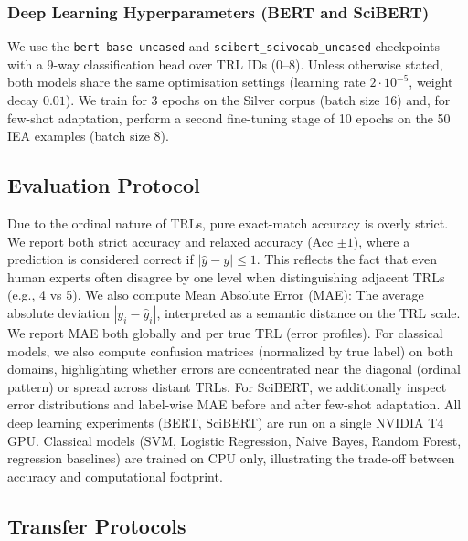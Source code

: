 \documentclass[runningheads]{llncs}
\begin{document}
\subsubsection{Deep Learning Hyperparameters (BERT and SciBERT)}
We use the \texttt{bert-base-uncased} and %
\texttt{scibert\_scivocab\_uncased}
checkpoints with a 9-way classification head over TRL IDs (0--8). Unless otherwise stated, both models share the same optimisation settings (learning rate $2 \cdot 10^{-5}$, weight decay $0.01$). We train for 3 epochs on the Silver corpus (batch size 16) and, for few-shot adaptation, perform a second fine-tuning stage of 10 epochs on the 50 IEA examples (batch size 8).

\subsection{Evaluation Protocol}
Due to the ordinal nature of TRLs, pure exact-match accuracy is overly strict. We report both strict accuracy and relaxed accuracy (Acc $\pm 1$), where a prediction is considered correct if $|\hat{y}-y|\le 1$. This reflects the fact that even human experts often disagree by one level when distinguishing adjacent TRLs (e.g., 4 vs 5).
We also compute {Mean Absolute Error (MAE):} The average absolute deviation $|y_i - \hat{y}_i|$, interpreted as a semantic distance on the TRL scale. We report MAE both globally and per true TRL (error profiles).
For classical models, we also compute confusion matrices (normalized by true label) on both domains, highlighting whether errors are concentrated near the diagonal (ordinal pattern) or spread across distant TRLs. For SciBERT, we additionally inspect error distributions and label-wise MAE before and after few-shot adaptation. %
All deep learning experiments (BERT, SciBERT) are run on a single NVIDIA T4 GPU. Classical models (SVM, Logistic Regression, Naive Bayes, Random Forest, regression baselines) are trained on CPU only, illustrating the trade-off between accuracy and computational footprint.


\subsection{Transfer Protocols}
\end{document}
